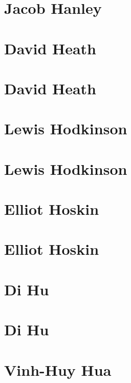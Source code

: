 \documentclass[twoside,14pt,a4paper,notitlepage]{memoir}
\begin{document}
\lipsum[1-2]
\section*{Jacob Hanley}
\lipsum[3]



\section*{David Heath}
\label{aut:heath}

\lipsum[1-2]
\section*{David Heath}
\lipsum[3]



\section*{Lewis Hodkinson}
\label{aut:hodkinson}

\lipsum[1-2]
\section*{Lewis Hodkinson}
\lipsum[3]



\section*{Elliot Hoskin}
\label{aut:hoskin}

\lipsum[1-2]
\section*{Elliot Hoskin}
\lipsum[3]



\section*{Di Hu}
\label{aut:hu}

\lipsum[1-2]
\section*{Di Hu}
\lipsum[3]



\section*{Vinh-Huy Hua}
\label{aut:hua}
\end{document}
